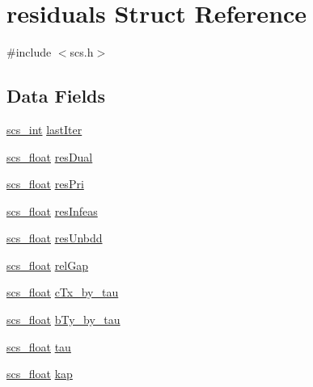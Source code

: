 \hypertarget{structresiduals}{\section{residuals Struct Reference}
\label{structresiduals}
}


{\ttfamily \#include $<$scs.\-h$>$}

\subsection*{Data Fields}
\begin{DoxyCompactItemize}
\item 
\hyperlink{glbopts_8h_a23c48a83ce0c58783595ad45ffcaf76b}{scs\-\_\-int} \hyperlink{structresiduals_a583d5935e4390bb53a5fe10d1df8324d}{last\-Iter}
\item 
\hyperlink{glbopts_8h_ad37836e6404bb2c3ae8adcc6290699b9}{scs\-\_\-float} \hyperlink{structresiduals_a27e0e9585f4b503ef6b19abff38d1537}{res\-Dual}
\item 
\hyperlink{glbopts_8h_ad37836e6404bb2c3ae8adcc6290699b9}{scs\-\_\-float} \hyperlink{structresiduals_a7b16b2674f7eea38fa1b62562bbb8a40}{res\-Pri}
\item 
\hyperlink{glbopts_8h_ad37836e6404bb2c3ae8adcc6290699b9}{scs\-\_\-float} \hyperlink{structresiduals_a26867eae4026f37b2a8dd10fa403ed61}{res\-Infeas}
\item 
\hyperlink{glbopts_8h_ad37836e6404bb2c3ae8adcc6290699b9}{scs\-\_\-float} \hyperlink{structresiduals_a37f2ac474c24c192d231b89804b15862}{res\-Unbdd}
\item 
\hyperlink{glbopts_8h_ad37836e6404bb2c3ae8adcc6290699b9}{scs\-\_\-float} \hyperlink{structresiduals_a879faec02daa66295002b336a526c34f}{rel\-Gap}
\item 
\hyperlink{glbopts_8h_ad37836e6404bb2c3ae8adcc6290699b9}{scs\-\_\-float} \hyperlink{structresiduals_ae941b0eae86b88fac62664d7e0b257ba}{c\-Tx\-\_\-by\-\_\-tau}
\item 
\hyperlink{glbopts_8h_ad37836e6404bb2c3ae8adcc6290699b9}{scs\-\_\-float} \hyperlink{structresiduals_a4d8e26a6bae6cedd688ee7d82aeb7127}{b\-Ty\-\_\-by\-\_\-tau}
\item 
\hyperlink{glbopts_8h_ad37836e6404bb2c3ae8adcc6290699b9}{scs\-\_\-float} \hyperlink{structresiduals_a5c1489c0727ed15ee0e718178d314c66}{tau}
\item 
\hyperlink{glbopts_8h_ad37836e6404bb2c3ae8adcc6290699b9}{scs\-\_\-float} \hyperlink{structresiduals_a3b3a62e7379ccc6f36578e0e390c9129}{kap}
\end{DoxyCompactItemize}


